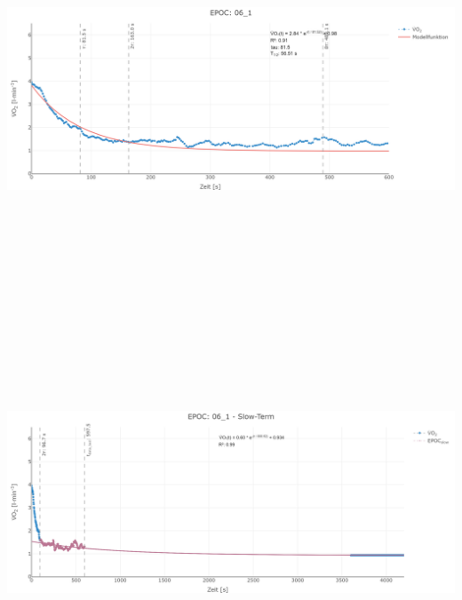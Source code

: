 \documentclass[
  letterpaper,
  DIV=11]{scrartcl}
\begin{document}
\includegraphics[width=11.45833in,height=4.6875in]{images/06_1_tau.png}
\includegraphics[width=11.45833in,height=4.6875in]{images/06_1_slow.png}
\end{document}
